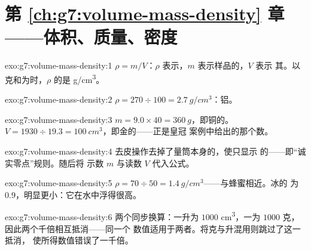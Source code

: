 \section*{第 \ref{ch:g7:volume-mass-density} 章——体积、质量、密度}

\begin{solution}{exo:g7:volume-mass-density:1}
$\rho = m/V$：$\rho$ 表示，$m$ 表示样品的，$V$ 表示
其。以克和为时，$\rho$ 的是
\unit{g/cm^3}。
\end{solution}

\begin{solution}{exo:g7:volume-mass-density:2}
$\rho = 270 \div 100 = \qty{2.7}{g/cm^3}$：铝。
\end{solution}

\begin{solution}{exo:g7:volume-mass-density:3}
$m = 9.0 \times 40 = \qty{360}{g}$，即铜的。
$V = 1930 \div 19.3 = \qty{100}{cm^3}$，即金的——正是皇冠
案例中给出的那个数。
\end{solution}

\begin{solution}{exo:g7:volume-mass-density:4}
去皮操作去掉了量筒本身的，使只显示
的——即“诚实零点”规则。随后将
示数 $m$ 与读数 $V$ 代入公式。
\end{solution}

\begin{solution}{exo:g7:volume-mass-density:5}
$\rho = 70 \div 50 = \qty{1.4}{g/cm^3}$——与蜂蜜相近。冰的
为 $0.9$，明显更小：它在水中浮得很高。
\end{solution}

\begin{solution}{exo:g7:volume-mass-density:6}
两个同步换算：一升为 $1000$ \unit{cm^3}，一为
$1000$ 克，因此两个千倍相互抵消——同一个
数值适用于两者。将克与升混用则跳过了这一抵消，
使所得数值错误了一千倍。
\end{solution}

